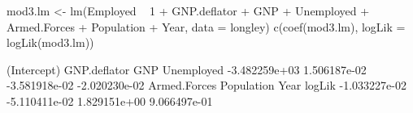 \begin{Schunk}
\begin{Sinput}
 mod3.lm <- lm(Employed ~ 1 + GNP.deflator + GNP + Unemployed
   + Armed.Forces + Population + Year, data = longley)
 c(coef(mod3.lm), logLik = logLik(mod3.lm))
\end{Sinput}
\begin{Soutput}
  (Intercept)  GNP.deflator           GNP    Unemployed 
-3.482259e+03  1.506187e-02 -3.581918e-02 -2.020230e-02 
 Armed.Forces    Population          Year        logLik 
-1.033227e-02 -5.110411e-02  1.829151e+00  9.066497e-01 
\end{Soutput}
\end{Schunk}
